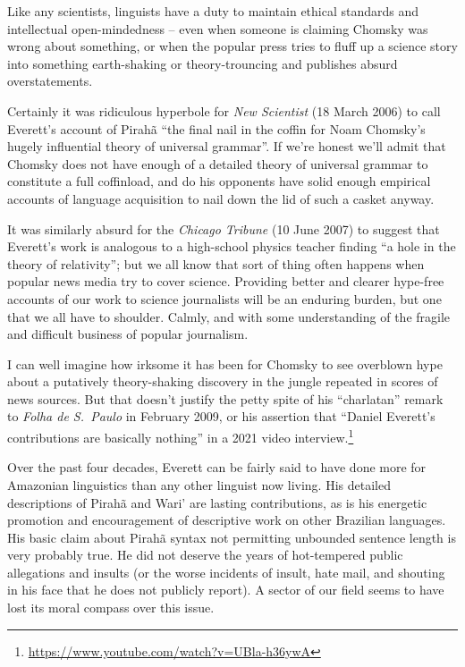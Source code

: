 \documentclass[output=paper,colorlinks,citecolor=brown
]{langscibook}
\begin{document}
Like any scientists, linguists have a duty to maintain ethical
standards and intellectual open-mindedness -- even when someone is
claiming Chomsky was wrong about something, or when the popular
press tries to fluff up a science story into something earth-shaking
or theory-trouncing and publishes absurd overstatements.

Certainly it was ridiculous hyperbole for
\textit{New Scientist} (18 March 2006)
to call Everett's account of Pirah{\~a} ``the final nail in the
coffin for Noam Chomsky's hugely influential theory of universal
grammar''. If we're honest we'll admit that Chomsky does not have
enough of a detailed theory of universal grammar to constitute a full
coffinload, and do his opponents have solid enough empirical accounts
of language acquisition to nail down the lid of such a casket anyway.

It was similarly absurd for the
\textit{Chicago Tribune} (10 June 2007)
to suggest that Everett's work is analogous to a high-school physics
teacher finding ``a hole in the theory of relativity''; but we all know
that sort of thing often happens when popular news media try to cover
science. Providing better and clearer hype-free accounts of our work
to science journalists will be an enduring burden, but one that we
all have to shoulder. Calmly, and with some understanding of the
fragile and difficult business of popular journalism.

I can well imagine how irksome it has been for Chomsky to see overblown
hype about a putatively theory-shaking discovery in the jungle repeated
in scores of news sources. But that doesn't justify the petty spite of
his ``charlatan'' remark to \textit{Folha de S.~Paulo} in February 2009,
or his assertion that ``Daniel Everett's contributions are basically
nothing'' in a 2021 video interview.\footnote{%
   \url{https://www.youtube.com/watch?v=UBla-h36ywA}}

Over the past four decades, Everett can be fairly said to have done
more for Amazonian linguistics than any other linguist now living.
His detailed descriptions of Pirah{\~a} and Wari' are lasting
contributions, as is his energetic promotion and encouragement of
descriptive work on other Brazilian languages. His basic claim about
Pirah{\~a} syntax not permitting unbounded sentence length is very
probably true. He did not deserve the years of hot-tempered public
allegations and insults (or the worse incidents of insult, hate mail,
and shouting in his face that he does not publicly report). A sector
of our field seems to have lost its moral compass over this issue.
\end{document}
